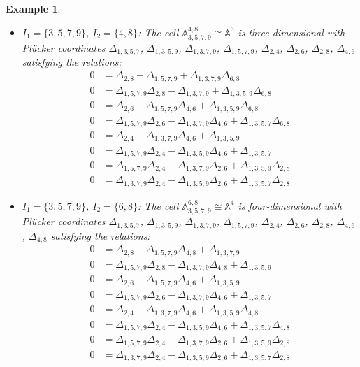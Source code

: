 \documentclass{amsart}
\newtheorem{example}[theorem]{Example}
\numberwithin{equation}{section}
\renewcommand{\AA}{\mathbb{A}}
\begin{document}
\begin{example}
\begin{itemize}
      \item $I_1=\{3,5,7,9\}$, $I_2=\{4,8\}$: The cell $\AA_{3,5,7,9}^{4,8} \cong \AA^3$ is three-dimensional with Pl\"ucker coordinates $\Delta_{1,3,5,7}$, $\Delta_{1,3,5,9}$, $\Delta_{1,3,7,9}$, $\Delta_{1,5,7,9}$, $\Delta_{2,4}$, $\Delta_{2,6}$, $\Delta_{2,8}$, $\Delta_{4,6}$ satisfying the relations:
      \begin{align*}
        0 &= \Delta_{2,8} - \Delta_{1,5,7,9} + \Delta_{1,3,7,9}\Delta_{6,8}\\
        0 &= \Delta_{1,5,7,9}\Delta_{2,8} - \Delta_{1,3,7,9} + \Delta_{1,3,5,9}\Delta_{6,8}\\
        0 &= \Delta_{2,6} - \Delta_{1,5,7,9}\Delta_{4,6} + \Delta_{1,3,5,9}\Delta_{6,8}\\
        0 &= \Delta_{1,5,7,9}\Delta_{2,6} - \Delta_{1,3,7,9}\Delta_{4,6} + \Delta_{1,3,5,7}\Delta_{6,8}\\
        0 &= \Delta_{2,4} - \Delta_{1,3,7,9}\Delta_{4,6} + \Delta_{1,3,5,9}\\
        0 &= \Delta_{1,5,7,9}\Delta_{2,4} - \Delta_{1,3,5,9}\Delta_{4,6} + \Delta_{1,3,5,7}\\
        0 &= \Delta_{1,5,7,9}\Delta_{2,4} - \Delta_{1,3,7,9}\Delta_{2,6} + \Delta_{1,3,5,9}\Delta_{2,8}\\
        0 &= \Delta_{1,3,7,9}\Delta_{2,4} - \Delta_{1,3,5,9}\Delta_{2,6} + \Delta_{1,3,5,7}\Delta_{2,8}
      \end{align*}

      \item $I_1=\{3,5,7,9\}$, $I_2=\{6,8\}$: The cell $\AA_{3,5,7,9}^{6,8} \cong \AA^4$ is four-dimensional with Pl\"ucker coordinates $\Delta_{1,3,5,7}$, $\Delta_{1,3,5,9}$, $\Delta_{1,3,7,9}$, $\Delta_{1,5,7,9}$, $\Delta_{2,4}$, $\Delta_{2,6}$, $\Delta_{2,8}$, $\Delta_{4,6}$, $\Delta_{4,8}$ satisfying the relations:
      \begin{align*}
        0 &= \Delta_{2,8} - \Delta_{1,5,7,9}\Delta_{4,8} + \Delta_{1,3,7,9}\\
        0 &= \Delta_{1,5,7,9}\Delta_{2,8} - \Delta_{1,3,7,9}\Delta_{4,8} + \Delta_{1,3,5,9}\\
        0 &= \Delta_{2,6} - \Delta_{1,5,7,9}\Delta_{4,6} + \Delta_{1,3,5,9}\\
        0 &= \Delta_{1,5,7,9}\Delta_{2,6} - \Delta_{1,3,7,9}\Delta_{4,6} + \Delta_{1,3,5,7}\\
        0 &= \Delta_{2,4} - \Delta_{1,3,7,9}\Delta_{4,6} + \Delta_{1,3,5,9}\Delta_{4,8}\\
        0 &= \Delta_{1,5,7,9}\Delta_{2,4} - \Delta_{1,3,5,9}\Delta_{4,6} + \Delta_{1,3,5,7}\Delta_{4,8}\\
        0 &= \Delta_{1,5,7,9}\Delta_{2,4} - \Delta_{1,3,7,9}\Delta_{2,6} + \Delta_{1,3,5,9}\Delta_{2,8}\\
        0 &= \Delta_{1,3,7,9}\Delta_{2,4} - \Delta_{1,3,5,9}\Delta_{2,6} + \Delta_{1,3,5,7}\Delta_{2,8}
      \end{align*}
    \end{itemize}
  \end{example}
\end{document}
